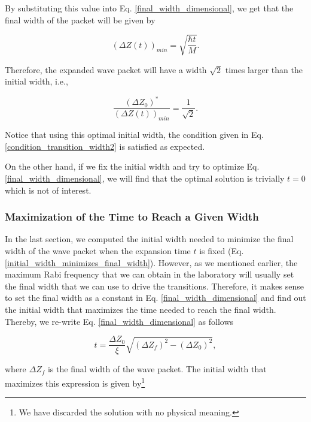 \documentclass{article}
\begin{document}
By substituting this value into Eq. \ref{final_width_dimensional}, we get that the final width of the packet will be given by

\begin{equation}\label{final_width_minimum}
    (\Delta Z(t))_{min}  = \sqrt{\frac{\hbar t}{M}}.
\end{equation}

Therefore, the expanded wave packet will have a width $\sqrt{2}$ times larger than the initial width, i.e.,

\begin{equation}\label{ration_optimial_initial_width_vs_final_width}
    \frac{(\Delta Z_{0})^{\ast}}{(\Delta Z(t))_{min}} = \frac{1}{\sqrt{2}}.
\end{equation}

Notice that using this optimal initial width, the condition given in Eq. \ref{condition_transition_width2} is satisfied as expected. 

On the other hand, if we fix the initial width and try to optimize Eq. \ref{final_width_dimensional}, we will find that the optimal solution is trivially $t=0$ which is not of interest.

\subsubsection{Maximization of the Time to Reach a Given Width}
In the last section, we computed the initial width needed to minimize the final width of the wave packet when the expansion time $t$ is fixed (Eq. \ref{initial_width_minimizes_final_width}). However, as we mentioned earlier, the maximum Rabi frequency that we can obtain in the laboratory will usually set the final width that we can use to drive the transitions. Therefore, it makes sense to set the final width as a constant in Eq. \ref{final_width_dimensional} and find out the initial width that maximizes the time needed to reach the final width. Thereby, we re-write Eq. \ref{final_width_dimensional} as follows

\begin{equation}\label{expansion_wave_packet_time_solution}
    t = \frac{\Delta Z_{0}}{\xi} \sqrt{(\Delta Z_{f})^2 - (\Delta Z_{0})^2},
\end{equation}

where $\Delta Z_{f}$ is the final width of the wave packet. The initial width that maximizes this expression is given by\footnote{We have discarded the solution with no physical meaning.}
\end{document}
